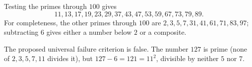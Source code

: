 Testing the primes through $100$ gives
\[
\boxed{11,13,17,19,23,29,37,43,47,53,59,67,73,79,89}.
\]
For completeness, the other primes through $100$ are $2,3,5,7,31,41,61,71,83,97$; subtracting $6$ gives either a number below $2$ or a composite.

The proposed universal failure criterion is false. The number $127$ is prime (none of $2,3,5,7,11$ divides it), but $127-6=121=11^2$, divisible by neither $5$ nor $7$.
